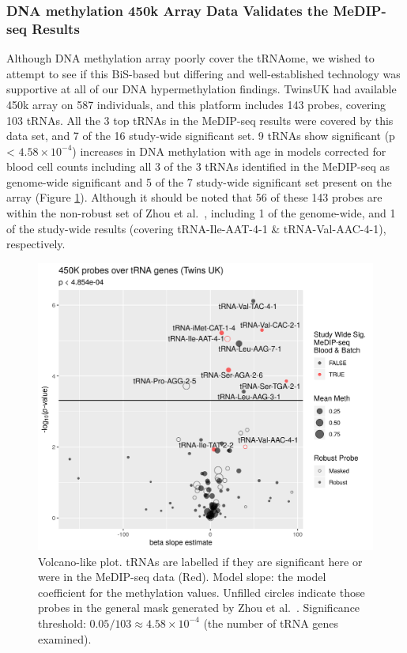 \documentclass[
]{book}
\begin{document}
\hypertarget{dna-methylation-450k-array-data-validates-the-medip-seq-results}{%
\subsubsection{DNA methylation 450k Array Data Validates the MeDIP-seq Results}\label{dna-methylation-450k-array-data-validates-the-medip-seq-results}}

Although DNA methylation array poorly cover the tRNAome, we wished to attempt to see if this BiS-based but differing and well-established technology was supportive at all of our DNA hypermethylation findings.
TwinsUK had available 450k array on 587 individuals, and this platform includes 143 probes, covering 103 tRNAs.
All the 3 top tRNAs in the MeDIP-seq results were covered by this data set, and 7 of the 16 study-wide significant set.
9 tRNAs show significant (p \textless{} \(4.58\times10^{-4}\)) increases in DNA methylation with age in models corrected for blood cell counts including all 3 of the 3 tRNAs identified in the MeDIP-seq as genome-wide significant and 5 of the 7 study-wide significant set present on the array (Figure \ref{fig:bloodEpitwins450kCounts}).
Although it should be noted that 56 of these 143 probes are within the non-robust set of Zhou et al.~\citep{Zhou2017}, including 1 of the genome-wide, and 1 of the study-wide results (covering tRNA-Ile-AAT-4-1 \& tRNA-Val-AAC-4-1), respectively.

\begin{figure}

{\centering \includegraphics[width=1\linewidth]{./figs/blood_epitwins450k_Counts_sws_bl_zhou} 

}

\caption{Volcano-like plot. tRNAs are labelled if they are significant here or were in the MeDIP-seq data (Red). Model slope: the model coefficient for the methylation values. Unfilled circles indicate those probes in the general mask generated by Zhou et al.~\citep{Zhou2017}. Significance threshold: \(0.05/103 \approx 4.58\times10^{-4}\) (the number of tRNA genes examined).}\label{fig:bloodEpitwins450kCounts}
\end{figure}
\end{document}
